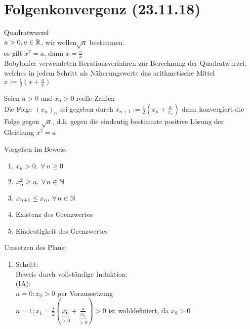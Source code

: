 \documentclass[../ana1u.tex]{subfiles}
\begin{document}
\setcounter{section}{4}

\section{Folgenkonvergenz (23.11.18)}
\begin{bsp}
    Quadratwurzel\\
    \(a > 0, a \in \mathbb{R}\), wir wollen\(\sqrt{a}\) bestimmen.\\
    es gilt \(x^2 = a\), dann \(x = \frac{a}{x}\)\vspace{5mm}\\
    Babylonier verwendeten Iterationsverfahren zur Berechnung der Quadratwurzel, welches in jedem Schritt als Näherungswerte das arithmetische Mittel\vspace{5mm}\\
    \(x := \frac{1}{2}(x+\frac{a}{x})\)
    \begin{beh}
        Seien \(a > 0\) und \(x_0 > 0\) reelle Zahlen\\
        Die Folge \((x_n)_n\) sei gegeben durch \(x_{n+1} := \frac{1}{2}(x_n + \frac{a}{x_n})\) dann konvergiert die Folge gegen \(\sqrt{a}\), d.h. gegen die eindeutig bestimmte positive Lösung der Gleichung \(x^2 = a\)
    \end{beh}		
    Vorgehen im Beweis:
    \begin{enumerate}
        \item \(x_n > 0, \; \forall \, n \geq 0\)
        \item \(x_n^2 \geq a, \; \forall \, n \in \mathbb{N}\)
        \item \(x_{n+1} \leq x_n, \; \forall \, n \in \mathbb{N}\)
        \item Existenz des Grenzwertes
        \item Eindeutigkeit des Grenzwertes
    \end{enumerate}
    \begin{bew}
        Umsetzen des Plans:\\
        \begin{enumerate}				
            \item Schritt:\\
                Beweis durch vollständige Induktion:\\
                (IA):\\
                \(n=0: x_0 > 0\) per Voraussetzung\\
                \(n=1: x_1 = \frac{1}{2}(\underbrace{x_0}_{>0} + \underbrace{\frac{a}{x_0}}_{>0}) > 0\) ist wohldefiniert, da \(x_0 > 0\)\\

\end{enumerate}
\end{bew}
\end{bsp}
\end{document}
